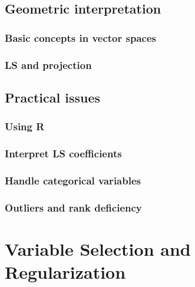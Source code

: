 \documentclass[
]{book}
\begin{document}
\hypertarget{geometric-interpretation}{%
\section{Geometric interpretation}\label{geometric-interpretation}}

\hypertarget{basic-concepts-in-vector-spaces}{%
\subsection{Basic concepts in vector spaces}\label{basic-concepts-in-vector-spaces}}

\hypertarget{ls-and-projection}{%
\subsection{LS and projection}\label{ls-and-projection}}

\hypertarget{practical-issues}{%
\section{Practical issues}\label{practical-issues}}

\hypertarget{using-r}{%
\subsection{Using R}\label{using-r}}

\hypertarget{interpret-ls-coefficients}{%
\subsection{Interpret LS coefficients}\label{interpret-ls-coefficients}}

\hypertarget{handle-categorical-variables}{%
\subsection{Handle categorical variables}\label{handle-categorical-variables}}

\hypertarget{outliers-and-rank-deficiency}{%
\subsection{Outliers and rank deficiency}\label{outliers-and-rank-deficiency}}

\hypertarget{variable-selection-and-regularization}{%
\chapter{Variable Selection and Regularization}\label{variable-selection-and-regularization}}
\end{document}
